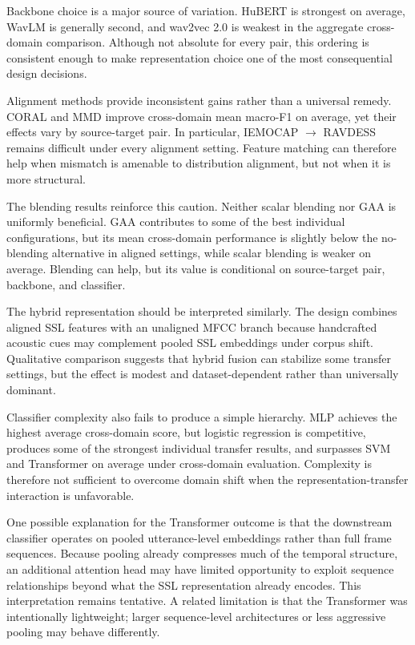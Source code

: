 \documentclass[9pt,twocolumn,letterpaper]{article}
\begin{document}
Backbone choice is a major source of variation. HuBERT is strongest on average, WavLM is generally second, and wav2vec 2.0 is weakest in the aggregate cross-domain comparison. Although not absolute for every pair, this ordering is consistent enough to make representation choice one of the most consequential design decisions.

Alignment methods provide inconsistent gains rather than a universal remedy. CORAL and MMD improve cross-domain mean macro-F1 on average, yet their effects vary by source-target pair. In particular, IEMOCAP $\rightarrow$ RAVDESS remains difficult under every alignment setting. Feature matching can therefore help when mismatch is amenable to distribution alignment, but not when it is more structural.

The blending results reinforce this caution. Neither scalar blending nor GAA is uniformly beneficial. GAA contributes to some of the best individual configurations, but its mean cross-domain performance is slightly below the no-blending alternative in aligned settings, while scalar blending is weaker on average. Blending can help, but its value is conditional on source-target pair, backbone, and classifier.

The hybrid representation should be interpreted similarly. The design combines aligned SSL features with an unaligned MFCC branch because handcrafted acoustic cues may complement pooled SSL embeddings under corpus shift. Qualitative comparison suggests that hybrid fusion can stabilize some transfer settings, but the effect is modest and dataset-dependent rather than universally dominant.

Classifier complexity also fails to produce a simple hierarchy. MLP achieves the highest average cross-domain score, but logistic regression is competitive, produces some of the strongest individual transfer results, and surpasses SVM and Transformer on average under cross-domain evaluation. Complexity is therefore not sufficient to overcome domain shift when the representation-transfer interaction is unfavorable.

One possible explanation for the Transformer outcome is that the downstream classifier operates on pooled utterance-level embeddings rather than full frame sequences. Because pooling already compresses much of the temporal structure, an additional attention head may have limited opportunity to exploit sequence relationships beyond what the SSL representation already encodes. This interpretation remains tentative. A related limitation is that the Transformer was intentionally lightweight; larger sequence-level architectures or less aggressive pooling may behave differently.
\end{document}
